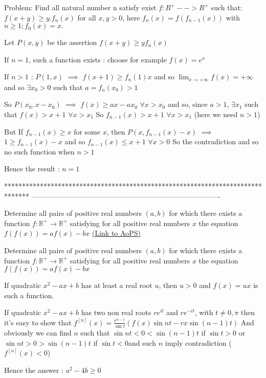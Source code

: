 \begin{solution}
	\begin{tcolorbox}Problem: Find all natural number n satisfy exist $f : R^{+} --> R^{+}$ such that:
$f(x+y) \geq y.f_{n}(x)$ for all $x,y > 0$, here $ f_{n}(x) = f(f_{n-1}(x))$ with $n \geq 1; f_{0}(x) = x.$\end{tcolorbox}
Let $P(x,y)$ be the assertion $f(x+y)\ge yf_n(x)$

If $n=1$, such a function exists : choose for example $f(x)=e^x$

If $n>1$ :
$P(1,x)$ $\implies$ $f(x+1)\ge f_n(1)x$ and so $\lim_{x\to+\infty}f(x)=+\infty$  and so $\exists x_0>0$ such that $a=f_n(x_0)>1$

So $P(x_0,x-x_0)$ $\implies$ $f(x)\ge ax-ax_0$ $\forall x>x_0$ and so, since $a>1$,  $\exists x_1$ such that $f(x)>x+1$ $\forall x>x_1$
So $f_{n-1}(x)>x+1$ $\forall x>x_1$ (here we need $n>1$)

But If $f_{n-1}(x)\ge x$ for some $x$, then $P(x,f_{n-1}(x)-x)$ $\implies$ $1\ge f_{n-1}(x)-x$ and so $f_{n-1}(x)\le x+1$ $\forall x>0$
So the contradiction and so no such function when $n>1$

Hence the result : $\boxed{n=1}$
\end{solution}
*******************************************************************************
-------------------------------------------------------------------------------

\begin{problem}
	Determine all pairs of positive real numbers $(a, b)$ for which there exists a function  $ f:\mathbb{R^{+}}\rightarrow\mathbb{R^{+}} $ satisfying for all positive real numbers $x$ the equation
$ f(f(x))=af(x)- bx $
	\flushright \href{https://artofproblemsolving.com/community/c6h481143}{(Link to AoPS)}
\end{problem}



\begin{solution}
	\begin{tcolorbox}Determine all pairs of positive real numbers $(a, b)$ for which there exists a function  $ f:\mathbb{R^{+}}\rightarrow\mathbb{R^{+}} $ satisfying for all positive real numbers $x$ the equation
$ f(f(x))=af(x)- bx $\end{tcolorbox}
If quadratic $x^2-ax+b$ has at least a real root $u$, then $u>0$ and $f(x)=ux$ is such a function.

If quadratic $x^2-ax+b$ has two non real roots $re^{it}$ and $re^{-it}$, with $t\ne 0,\pi$ then it's easy to show that $f^{[n]}(x)=\frac {r^{n-1}}{\sin t}(f(x)\sin nt-rx\sin(n-1)t)$
And obviously we can find $n$ such that $\sin nt<0<\sin(n-1)t$ if $\sin t >0$ or   $\sin nt>0>\sin(n-1)t$ if $\sin t <0$and such $n$ imply contradiction ($f^{[n]}(x)<0$)

Hence the answer : $\boxed{a^2-4b\ge 0}$
\end{solution}



